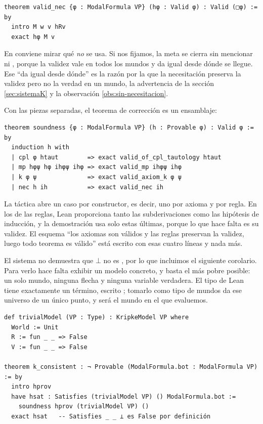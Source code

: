 \begin{lstlisting}
theorem valid_nec {φ : ModalFormula VP} (hφ : Valid φ) : Valid (□φ) := by
  intro M w v hRv
  exact hφ M v
\end{lstlisting}

En  conviene mirar qué \emph{no} se usa. Si nos fijamos, la meta se cierra sin mencionar  ni , porque la validez vale en todos los mundos y da igual desde dónde se llegue. Ese ``da igual desde dónde'' es la razón por la que la necesitación preserva la validez pero no la verdad en un mundo, la advertencia de la sección \ref{sec:sistemaK} y la observación \ref{obs:sin-necesitacion}.

Con las piezas separadas, el teorema de corrección es un ensamblaje:

\begin{lstlisting}
theorem soundness {φ : ModalFormula VP} (h : Provable φ) : Valid φ := by
  induction h with
  | cpl φ htaut        => exact valid_of_cpl_tautology htaut
  | mp hφψ hφ ihφψ ihφ => exact valid_mp ihφψ ihφ
  | k φ ψ              => exact valid_axiom_k φ ψ
  | nec h ih           => exact valid_nec ih
\end{lstlisting}

La táctica  abre un caso por constructor, es decir, uno por axioma y por regla. En los de las reglas, Lean proporciona tanto las subderivaciones como las hipótesis de inducción, y la demostración usa solo estas últimas, porque lo que hace falta es su validez. El esquema ``los axiomas son válidos y las reglas preservan la validez, luego todo teorema es válido'' está escrito con esas cuatro líneas y nada más.

El sistema no demuestra que $\bot$ no es , por lo que incluimos el siguiente corolario. Para verlo hace falta exhibir un modelo concreto, y basta el más pobre posible: un solo mundo, ninguna flecha y ninguna variable verdadera. El tipo  de Lean tiene exactamente un término, escrito \lean{()}; tomarlo como tipo de mundos da ese universo de un único punto, y \lean{()} será el mundo en el que evaluemos.

\begin{lstlisting}
def trivialModel (VP : Type) : KripkeModel VP where
  World := Unit
  R := fun _ _ => False
  V := fun _ _ => False

theorem k_consistent : ¬ Provable (ModalFormula.bot : ModalFormula VP) := by
  intro hprov
  have hsat : Satisfies (trivialModel VP) () ModalFormula.bot :=
    soundness hprov (trivialModel VP) ()
  exact hsat   -- Satisfies _ _ ⊥ es False por definición
\end{lstlisting}

